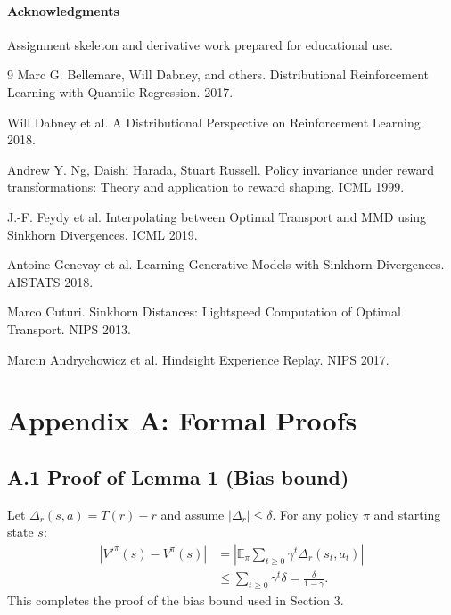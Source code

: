 \documentclass{article}
\begin{document}
\paragraph{Acknowledgments}
Assignment skeleton and derivative work prepared for educational use.


\begin{thebibliography}{9}
Marc G. Bellemare, Will Dabney, and others.
Distributional Reinforcement Learning with Quantile Regression. 2017.

Will Dabney et al. A Distributional Perspective on Reinforcement Learning. 2018.

Andrew Y. Ng, Daishi Harada, Stuart Russell. Policy invariance under reward transformations: Theory and application to reward shaping. ICML 1999.

J.-F. Feydy et al. Interpolating between Optimal Transport and MMD using Sinkhorn Divergences. ICML 2019.

Antoine Genevay et al. Learning Generative Models with Sinkhorn Divergences. AISTATS 2018.

Marco Cuturi. Sinkhorn Distances: Lightspeed Computation of Optimal Transport. NIPS 2013.

Marcin Andrychowicz et al. Hindsight Experience Replay. NIPS 2017.

\end{thebibliography}

\appendix
\section{Appendix A: Formal Proofs}
\subsection{A.1 Proof of Lemma 1 (Bias bound)}
Let $\Delta_r(s,a)=T(r)-r$ and assume $|\Delta_r|\le\delta$. For any policy $\pi$ and starting state $s$:
\begin{align*}
|V'^\pi(s)-V^\pi(s)| &= \left|\mathbb{E}_\pi\sum_{t\ge0}\gamma^t \Delta_r(s_t,a_t)\right| \\
&\le \sum_{t\ge0}\gamma^t \delta = \frac{\delta}{1-\gamma}.
\end{align*}
This completes the proof of the bias bound used in Section 3.
\end{document}
